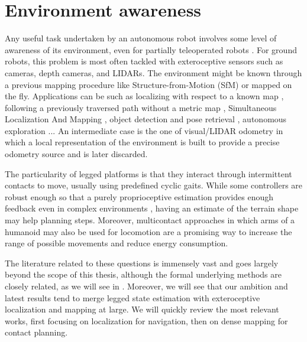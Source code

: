 \section{Environment awareness}
Any useful task undertaken by an autonomous robot involves some level of awareness of its environment, even for partially teleoperated robots \cite{koolen2016design}. 
For ground robots, this problem is most often tackled with exteroceptive sensors such as cameras, depth cameras, and LIDARs.
The environment might be known through a previous mapping procedure like Structure-from-Motion (SfM) \cite{triggs1999bundle} or mapped on the fly. 
Applications can be such as localizing with respect to a known map \cite{dellaert1999monte},
following a previously traversed path without a metric map \cite{furgale2010visual}, Simultaneous Localization And Mapping 
\cite{aulinas2008slam, cadena2016past}, object detection and pose retrieval \cite{du2021vision}, autonomous exploration \cite{rouvcek2019darpa, kulkarni2021autonomous}... 
An intermediate case is the one of visual/LIDAR odometry in which a local representation of the environment is built to provide a 
precise odometry source \cite{scaramuzza2011visual} and is later discarded. 


The particularity of legged platforms is that they interact through intermittent contacts to move, usually using predefined cyclic gaits. While some controllers are 
robust enough so that a purely proprioceptive estimation provides enough feedback even in complex environments \cite{tan2018sim, lee2020learning}, having an estimate of 
the terrain shape may help planning steps. Moreover, multicontact approaches \cite{carpentier2017multi, henze2017multi} in which arms of a humanoid may also be used 
for locomotion are a promising way to increase the range of possible movements and reduce energy consumption. 

The literature related to these questions is immensely vast and goes largely beyond the scope of this thesis, although the formal underlying methods are closely related,
as we will see in . Moreover, we will see that our ambition and latest results tend to merge legged state estimation with
exteroceptive localization and mapping at large. We will quickly review the most relevant works, first focusing on localization \eg for navigation, then 
on dense mapping for contact planning. 

